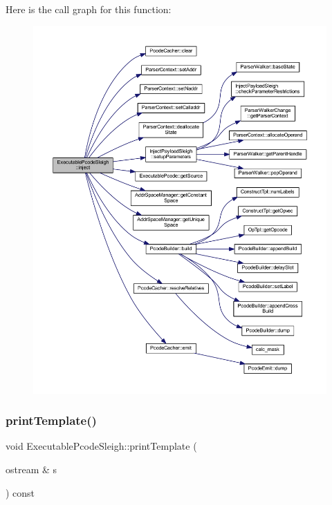 Here is the call graph for this function\+:
\nopagebreak
\begin{figure}[H]
\begin{center}
\leavevmode
\includegraphics[width=350pt]{class_executable_pcode_sleigh_a371bf279788a99380a3fb273e99a0266_cgraph}
\end{center}
\end{figure}
\mbox{\label{class_executable_pcode_sleigh_aff5af659202741955010a5302bd08dcd}} 
\subsubsection{\texorpdfstring{printTemplate()}{printTemplate()}}
{\footnotesize\ttfamily void Executable\+Pcode\+Sleigh\+::print\+Template (\begin{DoxyParamCaption}\item[{ostream \&}]{s }\end{DoxyParamCaption}) const\hspace{0.3cm}{\ttfamily [virtual]}}




